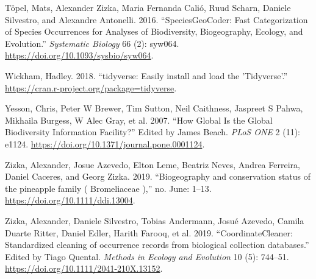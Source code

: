 \documentclass[fleqn,10pt,lineno]{wlpeerj} %
\begin{document}
\leavevmode\hypertarget{ref-Topel2016}{}%
Töpel, Mats, Alexander Zizka, Maria Fernanda Calió, Ruud Scharn, Daniele Silvestro, and Alexandre Antonelli. 2016. ``SpeciesGeoCoder: Fast Categorization of Species Occurrences for Analyses of Biodiversity, Biogeography, Ecology, and Evolution.'' \emph{Systematic Biology} 66 (2): syw064. \url{https://doi.org/10.1093/sysbio/syw064}.

\leavevmode\hypertarget{ref-Wickham2018}{}%
Wickham, Hadley. 2018. ``tidyverse: Easily install and load the 'Tidyverse'.'' \url{https://cran.r-project.org/package=tidyverse}.

\leavevmode\hypertarget{ref-Yesson2007}{}%
Yesson, Chris, Peter W Brewer, Tim Sutton, Neil Caithness, Jaspreet S Pahwa, Mikhaila Burgess, W Alec Gray, et al. 2007. ``How Global Is the Global Biodiversity Information Facility?'' Edited by James Beach. \emph{PLoS ONE} 2 (11): e1124. \url{https://doi.org/10.1371/journal.pone.0001124}.

\leavevmode\hypertarget{ref-Zizka2019a}{}%
Zizka, Alexander, Josue Azevedo, Elton Leme, Beatriz Neves, Andrea Ferreira, Daniel Caceres, and Georg Zizka. 2019. ``Biogeography and conservation status of the pineapple family ( Bromeliaceae ),'' no. June: 1--13. \url{https://doi.org/10.1111/ddi.13004}.

\leavevmode\hypertarget{ref-Zizka2019}{}%
Zizka, Alexander, Daniele Silvestro, Tobias Andermann, Josué Azevedo, Camila Duarte Ritter, Daniel Edler, Harith Farooq, et al. 2019. ``CoordinateCleaner: Standardized cleaning of occurrence records from biological collection databases.'' Edited by Tiago Quental. \emph{Methods in Ecology and Evolution} 10 (5): 744--51. \url{https://doi.org/10.1111/2041-210X.13152}.
\end{document}
